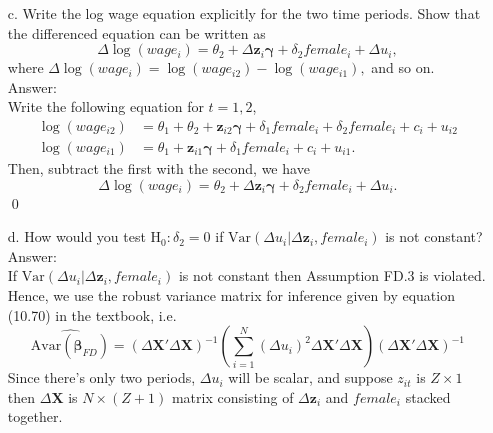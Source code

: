\documentclass[10pt]{article}
\newcommand{\V}{\text{Var}}
\newcommand{\Av}{\text{Avar}}
\newcommand{\Hy}{\text{H}}
\begin{document}
\begin{enumerate}
\item[c.] Write the log wage equation explicitly for the two time periods. Show that the differenced equation can be written as
\[\Delta\log(wage_i)=\theta_2+\Delta\textbf{z}_i\pmb{\gamma}+\delta_2female_i+\Delta u_i,\]
where $\Delta\log(wage_i)=\log(wage_{i2})-\log(wage_{i1}),$ and so on.
\\ Answer: \\
Write the following equation for $t=1,2$,
\begin{align*}
    \log(wage_{i2})&=\theta_1+\theta_2+\textbf{z}_{i2}\pmb{\gamma}+\delta_1 female_{i}+\delta_2 female_{i}+c_i+u_{i2}\\
    \log(wage_{i1})&=\theta_1+\textbf{z}_{i1}\pmb{\gamma}+\delta_1 female_{i}+c_i+u_{i1}.
\end{align*}
Then, subtract the first with the second, we have
\[\Delta\log(wage_i)=\theta_2+\Delta\textbf{z}_{i}\pmb{\gamma}+\delta_2 female_{i}+\Delta u_i.\]\qed
\item[d.] How would you test $\Hy_0 :\delta_2=0$ if $\V(\Delta u_i|\Delta\textbf{z}_i,female_i)$ is not constant?
\\ Answer: \\
If $\V(\Delta u_i|\Delta\textbf{z}_i,female_i)$ is not constant then Assumption FD.3 is violated. Hence, we use the robust variance matrix for inference given by equation (10.70) in the textbook, i.e.
\[\hat{\Av(\hat{\pmb{\beta}}_{FD})}=(\Delta\textbf{X}'\Delta\textbf{X})^{-1}\left(\sum_{i=1}^N(\Delta u_i)^2\Delta\textbf{X}'\Delta\textbf{X}\right)(\Delta\textbf{X}'\Delta\textbf{X})^{-1}\]
Since there's only two periods, $\Delta u_i$ will be scalar, and suppose $z_{it}$ is $Z\times 1$ then $\Delta \textbf{X}$ is $N\times(Z+1)$ matrix consisting of $\Delta\textbf{z}_{i}$ and $female_i$ stacked together.

\end{enumerate}
\end{document}
